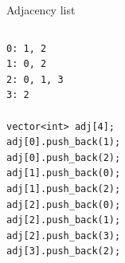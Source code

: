\documentclass{beamer}
\begin{document}
\begin{frame}{Adjacency list}

    \begin{columns}[T]
        \begin{column}{.4\textwidth}
            \begin{verbatim}
0: 1, 2
1: 0, 2
2: 0, 1, 3
3: 2

vector<int> adj[4];
adj[0].push_back(1);
adj[0].push_back(2);
adj[1].push_back(0);
adj[1].push_back(2);
adj[2].push_back(0);
adj[2].push_back(1);
adj[2].push_back(3);
adj[3].push_back(2);
            \end{verbatim}
        \end{column}%
        \hfill%
        \begin{column}{.4\textwidth}
            \begin{figure}
            \end{figure}
        \end{column}%
    \end{columns}
\end{frame}
\end{document}
